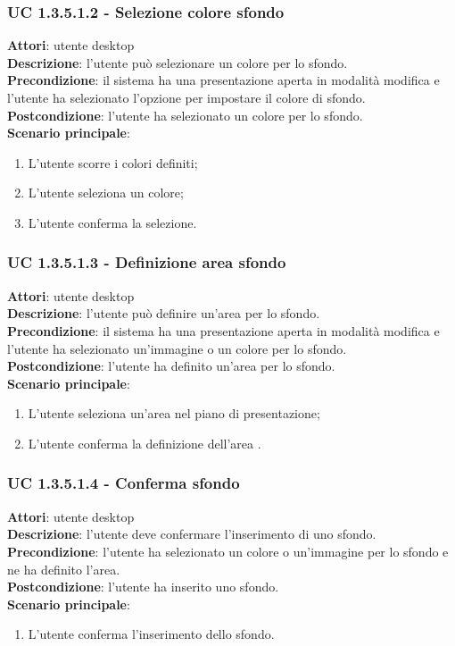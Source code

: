 \subsubsection{UC 1.3.5.1.2 - Selezione colore sfondo}{
	\label{uc1.3.5.1.2}
	\textbf{Attori}: utente desktop \\
	\textbf{Descrizione}: l'utente può selezionare un colore per lo sfondo. \\
	\textbf{Precondizione}: il sistema ha una presentazione aperta in modalità modifica e l'utente ha selezionato l'opzione per impostare il colore di sfondo.	\\
	\textbf{Postcondizione}: l'utente ha selezionato un colore per lo sfondo.	\\
	\textbf{Scenario principale}:
	\begin{enumerate}
		\item L'utente scorre i colori definiti;
		\item L'utente seleziona un colore;
		\item L'utente conferma la selezione.
	\end{enumerate}
}
\subsubsection{UC 1.3.5.1.3 - Definizione area sfondo}{
	\label{uc1.3.5.1.3}
	\textbf{Attori}: utente desktop \\
	\textbf{Descrizione}: l'utente può definire un'area per lo sfondo. \\
	\textbf{Precondizione}: il sistema ha una presentazione aperta in modalità modifica e l'utente ha selezionato un'immagine o un colore per lo sfondo.	\\
	\textbf{Postcondizione}: l'utente ha definito un'area per lo sfondo.	\\
	\textbf{Scenario principale}:
	\begin{enumerate}
		\item L'utente seleziona un'area nel piano di presentazione;
		\item L'utente conferma la definizione dell'area .
	\end{enumerate}
}
\subsubsection{UC 1.3.5.1.4 - Conferma sfondo}{
	\label{uc1.3.5.1.4}
	\textbf{Attori}: utente desktop \\
	\textbf{Descrizione}: l'utente deve confermare l'inserimento di uno sfondo. \\
	\textbf{Precondizione}: l'utente ha selezionato un colore o un'immagine per lo sfondo e ne ha definito l'area.	\\
	\textbf{Postcondizione}: l'utente ha inserito uno sfondo.	\\
	\textbf{Scenario principale}:
	\begin{enumerate}
		\item L'utente conferma l'inserimento dello sfondo.
	\end{enumerate}
}
